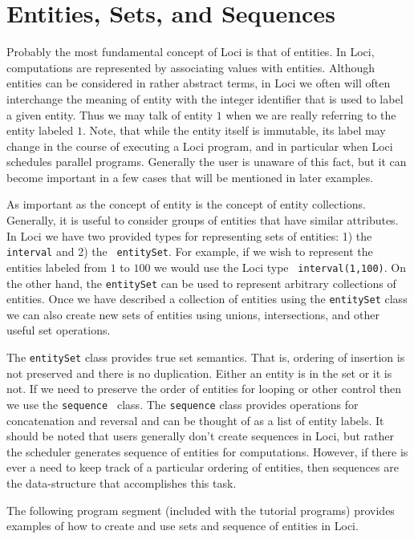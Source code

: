 \documentclass[10pt,epsf]{book}
\begin{document}
\section{Entities, Sets, and Sequences}

Probably the most fundamental concept of Loci is that of entities.  In
Loci, computations are represented by associating values with
entities.  Although entities can be considered in rather abstract
terms, in Loci we often will often interchange the meaning of entity
with the integer identifier that is used to label a given entity.
Thus we may talk of entity $1$ when we are really referring to the
entity labeled $1$.  Note, that while the entity itself is immutable,
its label may change in the course of executing a Loci program, and in
particular when Loci schedules parallel programs.  Generally the user
is unaware of this fact, but it can become important in a few cases
that will be mentioned in later examples.

As important as the concept of entity is the concept of entity
collections.  Generally, it is useful to consider groups of entities
that have similar attributes.  In Loci we have two provided types for
representing sets of entities: 1) the {\tt interval} and 2) the {\tt
  entitySet}.  For example, if we wish to represent the entities
labeled from $1$ to $100$ we would use the Loci type {\tt
  interval(1,100)}.  On the other hand, the {\tt entitySet} can be
used to represent arbitrary collections of entities.  Once we have
described a collection of entities using the {\tt entitySet} class we
can also create new sets of entities using unions, intersections, and
other useful set operations.

The {\tt entitySet} class provides true set semantics.
That is, ordering of insertion is not preserved and there is no
duplication.  Either an entity is in the set or it is not.  If we need
to preserve the order of entities for looping or other control then we
use the {\tt sequence } class.  The {\tt sequence} class provides
operations for concatenation and reversal and can be thought
of as a list of entity labels.  It should be noted that users
generally don't create sequences in Loci, but rather the scheduler
generates sequence of entities for computations.  However, if there is
ever a need to keep track of a particular ordering of entities, then
sequences are the data-structure that accomplishes this task.

The following program segment (included with the tutorial programs)
provides examples of how to create and use sets and sequence of
entities in Loci.
\end{document}

